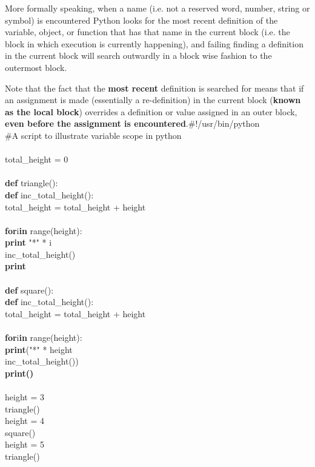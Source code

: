 More formally speaking,   when a name (i.e. not a reserved word, number, string or symbol) is   encountered Python looks for the most recent definition of the   variable, object, or function that has that name in the current block   (i.e. the block in which execution is currently happening), and failing   finding a definition in the current block will search outwardly in a   block wise fashion to the outermost block.

Note that the fact that the \textbf{most recent} definition   is searched for means that if an assignment is made (essentially a   re-definition) in the current block (\textbf{known as the local   block}) overrides a definition or value assigned in an outer   block, \textbf{even before the assignment is encountered}.\#!/usr/bin/python
\\    \#A script to illustrate variable scope in python
\\
\\total\_height = 0
\\
\\\textbf{def} triangle():
\\\textbf{def} inc\_total\_height():
\\total\_height = total\_height + height
\\
\\\textbf{for}i\textbf{in} range(height):
\\\textbf{print} "*" * i
\\ inc\_total\_height()
\\\textbf{print}
\\
\\\textbf{def} square():
\\\textbf{def} inc\_total\_height():
\\total\_height = total\_height + height
\\
\\\textbf{for}i\textbf{in} range(height):
\\\textbf{print}("*" * height
\\ inc\_total\_height())
\\\textbf{print()}
\\
\\height = 3
\\    triangle()
\\height = 4
\\    square()
\\height = 5
\\    triangle()
\\

